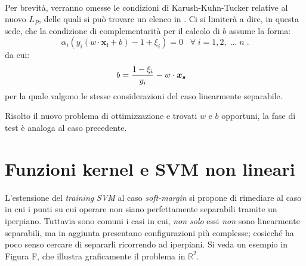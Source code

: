 \paragraph{}
Per brevità, verranno omesse le condizioni di Karush-Kuhn-Tucker relative al nuovo $L_P$, delle quali si può trovare un elenco in \cite{tutorial}. Ci si limiterà a dire, in questa sede, che la condizione di complementarità per il calcolo di $b$ assume la forma:
\begin{equation}
	\alpha_i(y_i(w \cdot \boldsymbol{x_i} + b) - 1 + \xi_i) = 0 \;\;\; \forall \; i = 1, 2, \;...\; n \;.
\end{equation}
da cui:
\begin{equation}	
	b = \frac{1 - \xi_i}{y_i} - w \cdot \boldsymbol{x_s} \;\;\; 
\vspace{2mm}
\end{equation}
per la quale valgono le stesse considerazioni del caso linearmente separabile.

Risolto il nuovo problema di ottimizzazione e trovati $w$ e $b$ opportuni, la fase di test è analoga al caso precedente.


\section{Funzioni kernel e SVM non lineari}

L'estensione del \textit{training} \textit{SVM} al caso \textit{soft-margin} si propone di rimediare al caso in cui i punti su cui operare non siano perfettamente separabili tramite un iperpiano. Tuttavia sono comuni i casi in cui, \textit{non solo} essi \textit{non} sono linearmente separabili, ma in aggiunta presentano configurazioni più complesse; cosicché ha poco senso cercare di separarli ricorrendo ad iperpiani. Si veda un esempio in Figura F, che illustra graficamente il problema in $\mathbb{R}^2$.

